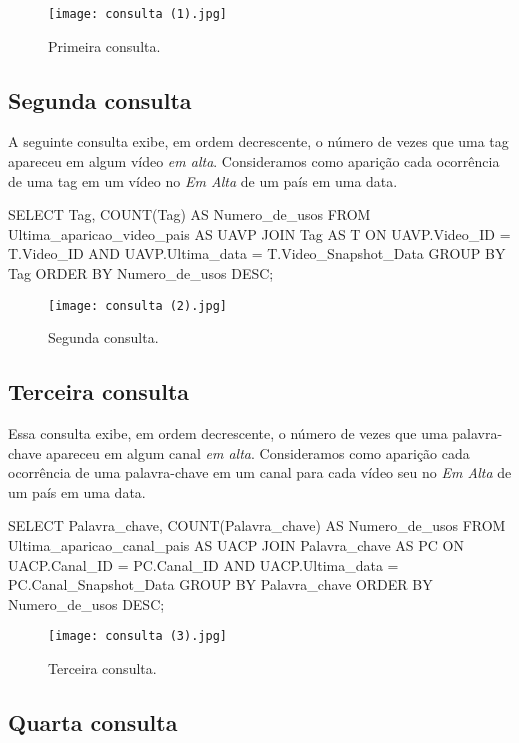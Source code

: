 \begin{figure}[H]
  \centering
  \texttt{[image: consulta (1).jpg]}
  \caption{Primeira consulta.}
\end{figure}

\subsection{Segunda consulta}

  A seguinte consulta exibe, em ordem decrescente, o número de vezes que uma tag apareceu em algum vídeo \emph{em alta}. Consideramos como aparição cada ocorrência de uma tag em um vídeo no \emph{Em Alta} de um país em uma data.

\begin{code}
SELECT Tag, COUNT(Tag) AS Numero_de_usos
FROM Ultima_aparicao_video_pais AS UAVP JOIN
    Tag AS T ON UAVP.Video_ID = T.Video_ID AND
          UAVP.Ultima_data = T.Video_Snapshot_Data
GROUP BY Tag
ORDER BY Numero_de_usos DESC;
\end{code}

\begin{figure}[H]
  \centering
  \texttt{[image: consulta (2).jpg]}
  \caption{Segunda consulta.}
\end{figure}

\subsection{Terceira consulta}

  Essa consulta exibe, em ordem decrescente, o número de vezes que uma palavra-chave apareceu em algum canal \emph{em alta}. Consideramos como aparição cada ocorrência de uma palavra-chave em um canal para cada vídeo seu no \emph{Em Alta} de um país em uma data.

\begin{code}
SELECT Palavra_chave, COUNT(Palavra_chave) AS Numero_de_usos
FROM Ultima_aparicao_canal_pais AS UACP JOIN
    Palavra_chave AS PC ON UACP.Canal_ID = PC.Canal_ID AND
                  UACP.Ultima_data = PC.Canal_Snapshot_Data
GROUP BY Palavra_chave
ORDER BY Numero_de_usos DESC;
\end{code}

\begin{figure}[H]
  \centering
  \texttt{[image: consulta (3).jpg]}
  \caption{Terceira consulta.}
\end{figure}

\subsection{Quarta consulta}

